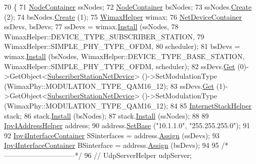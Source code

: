 \begin{DoxyCode}
70 \{
71   \hyperlink{classns3_1_1NodeContainer}{NodeContainer} ssNodes;
72   \hyperlink{classns3_1_1NodeContainer}{NodeContainer} bsNodes;
73   ssNodes.\hyperlink{classns3_1_1NodeContainer_a787f059e2813e8b951cc6914d11dfe69}{Create} (2);
74   bsNodes.\hyperlink{classns3_1_1NodeContainer_a787f059e2813e8b951cc6914d11dfe69}{Create} (1);
75   \hyperlink{classns3_1_1WimaxHelper}{WimaxHelper} wimax;
76   \hyperlink{classns3_1_1NetDeviceContainer}{NetDeviceContainer} ssDevs, bsDevs;
77   ssDevs = wimax.\hyperlink{classns3_1_1WimaxHelper_a9f0848e09c4b6db9cdde9872b38f6349}{Install} (ssNodes,
78                           WimaxHelper::DEVICE\_TYPE\_SUBSCRIBER\_STATION,
79                           WimaxHelper::SIMPLE\_PHY\_TYPE\_OFDM,
80                           scheduler);
81   bsDevs = wimax.\hyperlink{classns3_1_1WimaxHelper_a9f0848e09c4b6db9cdde9872b38f6349}{Install} (bsNodes, WimaxHelper::DEVICE\_TYPE\_BASE\_STATION, 
      WimaxHelper::SIMPLE\_PHY\_TYPE\_OFDM, scheduler);
82   ssDevs.\hyperlink{classns3_1_1NetDeviceContainer_a677d62594b5c9d2dea155cc5045f4d0b}{Get} (0)->GetObject<\hyperlink{classns3_1_1SubscriberStationNetDevice}{SubscriberStationNetDevice}> ()->SetModulationType 
      (WimaxPhy::MODULATION\_TYPE\_QAM16\_12);
83   ssDevs.\hyperlink{classns3_1_1NetDeviceContainer_a677d62594b5c9d2dea155cc5045f4d0b}{Get} (1)->GetObject<\hyperlink{classns3_1_1SubscriberStationNetDevice}{SubscriberStationNetDevice}> ()->SetModulationType 
      (WimaxPhy::MODULATION\_TYPE\_QAM16\_12);
84 
85   \hyperlink{classns3_1_1InternetStackHelper}{InternetStackHelper} stack;
86   stack.\hyperlink{classns3_1_1InternetStackHelper_a6645b412f31283d2d9bc3d8a95cebbc0}{Install} (bsNodes);
87   stack.\hyperlink{classns3_1_1InternetStackHelper_a6645b412f31283d2d9bc3d8a95cebbc0}{Install} (ssNodes);
88 
89   \hyperlink{classns3_1_1Ipv4AddressHelper}{Ipv4AddressHelper} address;
90   address.\hyperlink{classns3_1_1Ipv4AddressHelper_acf7b16dd25bac67e00f5e25f90a9a035}{SetBase} (\textcolor{stringliteral}{"10.1.1.0"}, \textcolor{stringliteral}{"255.255.255.0"});
91 
92   \hyperlink{classns3_1_1Ipv4InterfaceContainer}{Ipv4InterfaceContainer} SSinterfaces = address.\hyperlink{classns3_1_1Ipv4AddressHelper_af8e7f4a1a7e74c00014a1eac445a27af}{Assign} (ssDevs);
93   \hyperlink{classns3_1_1Ipv4InterfaceContainer}{Ipv4InterfaceContainer} BSinterface = address.\hyperlink{classns3_1_1Ipv4AddressHelper_af8e7f4a1a7e74c00014a1eac445a27af}{Assign} (bsDevs);
94 
95   \textcolor{comment}{/*------------------------------*/}
96   \textcolor{comment}{//  UdpServerHelper udpServer;}

\end{DoxyCode}
